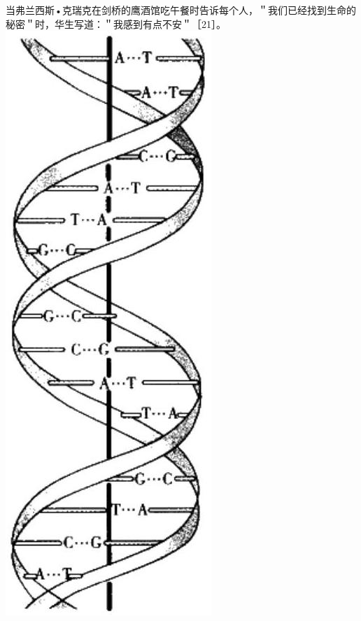 当弗兰西斯•克瑞克在剑桥的鹰酒馆吃午餐时告诉每个人，＂我们已经找到生命的秘密＂时，华生写道：＂我感到有点不安＂［21］。\\
\includegraphics[width=\textwidth]{images/2025_05_15_6a28331d5e7c993ad07ag-590.jpg}

